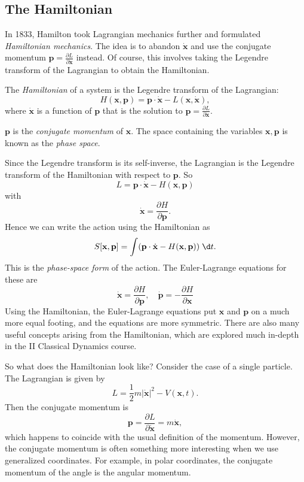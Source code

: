 \documentclass[a4paper]{article}
\begin{document}
\subsection{The Hamiltonian}
In 1833, Hamilton took Lagrangian mechanics further and formulated \emph{Hamiltonian mechanics}. The idea is to abandon $\dot{\mathbf{x}}$ and use the conjugate momentum $\mathbf{p} = \frac{\partial L}{\partial \dot{\mathbf{x}}}$ instead. Of course, this involves taking the Legendre transform of the Lagrangian to obtain the Hamiltonian.

\begin{defi}[Hamiltonian]
  The \emph{Hamiltonian} of a system is the Legendre transform of the Lagrangian:
  \[
    H(\mathbf{x}, \mathbf{p}) = \mathbf{p}\cdot \dot{\mathbf{x}} - L(\mathbf{x}, \dot{\mathbf{x}}),
  \]
  where $\dot{\mathbf{x}}$ is a function of $\mathbf{p}$ that is the solution to $\mathbf{p} = \frac{\partial L}{\partial \dot{\mathbf{x}}}$.

  $\mathbf{p}$ is the \emph{conjugate momentum} of $\mathbf{x}$. The space containing the variables $\mathbf{x}, \mathbf{p}$ is known as the \emph{phase space}.
\end{defi}

Since the Legendre transform is its self-inverse, the Lagrangian is the Legendre transform of the Hamiltonian with respect to $\mathbf{p}$. So
\[
  L = \mathbf{p}\cdot \dot{\mathbf{x}} - H(\mathbf{x}, \mathbf{p})
\]
with
\[
  \dot{\mathbf{x}} = \frac{\partial H}{\partial \mathbf{p}}.
\]
Hence we can write the action using the Hamiltonian as
\[
  S[\mathbf{x}, \mathbf{p}] = \int (\mathbf{p}\cdot \dot{\mathbf{x}} - H(\mathbf{x}, \mathbf{p}))\;\d t.
\]
This is the \emph{phase-space form} of the action. The Euler-Lagrange equations for these are
\[
  \dot{\mathbf{x}} = \frac{\partial H}{\partial \mathbf{p}}, \quad \dot{\mathbf{p}} = -\frac{\partial H}{\partial \mathbf{x}}
\]
Using the Hamiltonian, the Euler-Lagrange equations put $\mathbf{x}$ and $\mathbf{p}$ on a much more equal footing, and the equations are more symmetric. There are also many useful concepts arising from the Hamiltonian, which are explored much in-depth in the II Classical Dynamics course.

So what does the Hamiltonian look like? Consider the case of a single particle. The Lagrangian is given by
\[
  L = \frac{1}{2}m|\dot{\mathbf{x}}|^2 - V(\mathbf{x}, t).
\]
Then the conjugate momentum is
\[
  \mathbf{p} = \frac{\partial L}{\partial \dot{\mathbf{x}}} = m\dot{\mathbf{x}},
\]
which happens to coincide with the usual definition of the momentum. However, the conjugate momentum is often something more interesting when we use generalized coordinates. For example, in polar coordinates, the conjugate momentum of the angle is the angular momentum.
\end{document}
